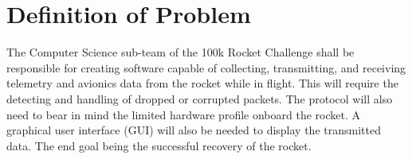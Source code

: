 \documentclass[onecolumn, draftclsnofoot,10pt, compsoc]{IEEEtran}
\begin{document}
\begin{titlepage}
\begin{singlespace}
\begin{abstract}
        \end{abstract}     
    \end{singlespace}
\end{titlepage}
\newpage
{}
\tableofcontents
\clearpage

\section{Definition of Problem}
The Computer Science sub-team of the 100k Rocket Challenge shall be responsible for creating software capable of collecting, transmitting, and receiving telemetry and avionics data from the rocket while in flight. This will require the detecting and handling of dropped or corrupted packets. The protocol will also need to bear in mind the limited hardware profile onboard the rocket. A graphical user interface (GUI) will also be needed to display the transmitted data. The end goal being the successful recovery of the rocket.\par
\end{document}
